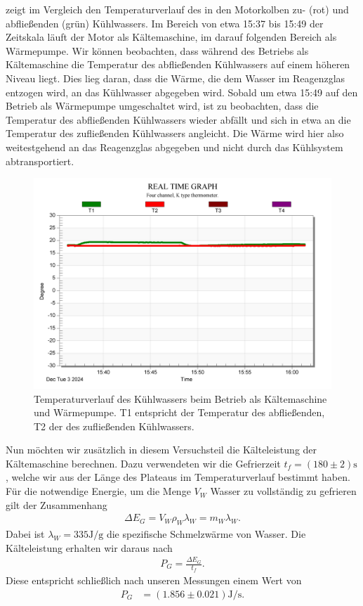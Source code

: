  zeigt im Vergleich den Temperaturverlauf des in den Motorkolben zu- (rot) und abfließenden (grün) Kühlwassers. Im Bereich von etwa 15:37 bis 15:49 der Zeitskala läuft der Motor als Kältemaschine, im darauf folgenden Bereich als Wärmepumpe. Wir können beobachten, dass während des Betriebs als Kältemaschine die Temperatur des abfließenden Kühlwassers auf einem höheren Niveau liegt. Dies lieg daran, dass die Wärme, die dem Wasser im Reagenzglas entzogen wird, an das Kühlwasser abgegeben wird. Sobald um etwa 15:49 auf den Betrieb als Wärmepumpe umgeschaltet wird, ist zu beobachten, dass die Temperatur des abfließenden Kühlwassers wieder abfällt und sich in etwa an die Temperatur des zufließenden Kühlwassers angleicht. Die Wärme wird hier also weitestgehend an das Reagenzglas abgegeben und nicht durch das Kühlsystem abtransportiert.

\begin{figure}[H]
    \centering
    \includegraphics[width=.9\textwidth]{files/aufgabe2_kuehltemp.png}
    \caption{Temperaturverlauf des Kühlwassers beim Betrieb als Kältemaschine und Wärmepumpe. T1 entspricht der Temperatur des abfließenden, T2 der des zufließenden Kühlwassers.}
    \label{fig:aufgabe2_kuehltemp}
\end{figure}

Nun möchten wir zusätzlich in diesem Versuchsteil die Kälteleistung der Kältemaschine berechnen. Dazu verwendeten wir die Gefrierzeit $t_f = (180 \pm 2)\si{\second}$, welche wir aus der Länge des Plateaus im Temperaturverlauf bestimmt haben. Für die notwendige Energie, um die Menge $V_W$ Wasser zu vollständig zu gefrieren gilt der Zusammenhang
\begin{align}
    \Delta E_G = V_W \rho_W \lambda_W = m_W \lambda_W.
\end{align}
Dabei ist $\lambda_W = 335\si{\joule\per\gram}$ die spezifische Schmelzwärme von Wasser. Die Kälteleistung erhalten wir daraus nach
\begin{align}
    P_G = \frac{\Delta E_G}{t_f}.
\end{align}
Diese entspricht schließlich nach unseren Messungen einem Wert von
\begin{align}
    P_G &= (1.856 \pm 0.021)\si{\joule\per\second}.
\end{align}

